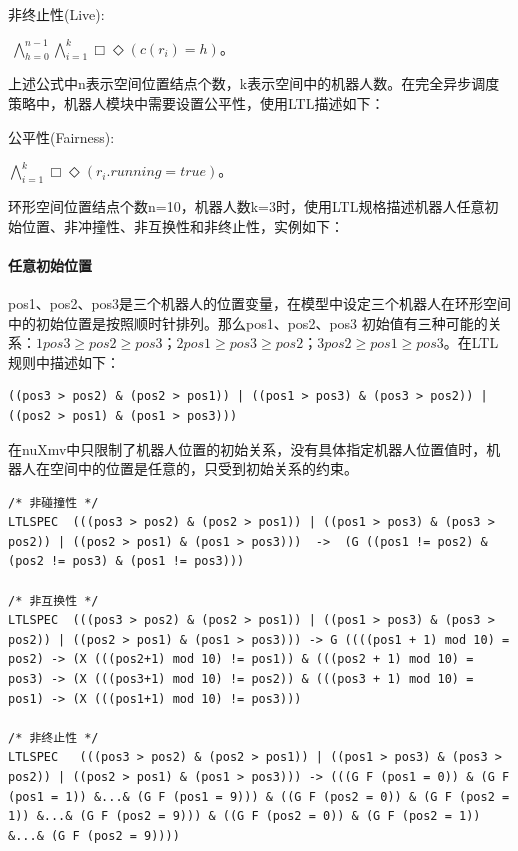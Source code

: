 \vspace{0.2cm}

\begin{bfseries}非终止性(Live):\end{bfseries}$\ \bigwedge_{h=0}^{n-1} \bigwedge_{i=1}^{k} \Box \Diamond \left(c\left(r_i\right)=h\right)$。

\vspace{0.2cm}

上述公式中n表示空间位置结点个数，k表示空间中的机器人数。在完全异步调度策略中，机器人模块中需要设置公平性，使用LTL描述如下：

\vspace{0.2cm}

\begin{bfseries}公平性(Fairness):\end{bfseries}$\bigwedge_{i=1}^{k} \Box \Diamond \left(r_i.running = true\right)$。

\vspace{0.2cm}

环形空间位置结点个数n=10，机器人数k=3时，使用LTL规格描述机器人任意初始位置、非冲撞性、非互换性和非终止性，实例如下：

\paragraph{任意初始位置}
pos1、pos2、pos3是三个机器人的位置变量，在模型中设定三个机器人在环形空间中的初始位置是按照顺时针排列。那么pos1、pos2、pos3 初始值有三种可能的关系：$1 pos3 \ge pos2 \ge pos3$；$2pos1 \ge pos3 \ge pos2$；$3 pos2 \ge pos1 \ge pos3$。在LTL规则中描述如下：

\begin{lstlisting}
((pos3 > pos2) & (pos2 > pos1)) | ((pos1 > pos3) & (pos3 > pos2)) | ((pos2 > pos1) & (pos1 > pos3)))
\end{lstlisting}

在nuXmv中只限制了机器人位置的初始关系，没有具体指定机器人位置值时，机器人在空间中的位置是任意的，只受到初始关系的约束。

\begin{lstlisting}
/* 非碰撞性 */
LTLSPEC  (((pos3 > pos2) & (pos2 > pos1)) | ((pos1 > pos3) & (pos3 > pos2)) | ((pos2 > pos1) & (pos1 > pos3)))  ->  (G ((pos1 != pos2) & (pos2 != pos3) & (pos1 != pos3)))

/* 非互换性 */
LTLSPEC  (((pos3 > pos2) & (pos2 > pos1)) | ((pos1 > pos3) & (pos3 > pos2)) | ((pos2 > pos1) & (pos1 > pos3))) -> G ((((pos1 + 1) mod 10) = pos2) -> (X (((pos2+1) mod 10) != pos1)) & (((pos2 + 1) mod 10) = pos3) -> (X (((pos3+1) mod 10) != pos2)) & (((pos3 + 1) mod 10) = pos1) -> (X (((pos1+1) mod 10) != pos3)))

/* 非终止性 */
LTLSPEC   (((pos3 > pos2) & (pos2 > pos1)) | ((pos1 > pos3) & (pos3 > pos2)) | ((pos2 > pos1) & (pos1 > pos3))) -> (((G F (pos1 = 0)) & (G F (pos1 = 1)) &...& (G F (pos1 = 9))) & ((G F (pos2 = 0)) & (G F (pos2 = 1)) &...& (G F (pos2 = 9))) & ((G F (pos2 = 0)) & (G F (pos2 = 1)) &...& (G F (pos2 = 9))))
\end{lstlisting}

